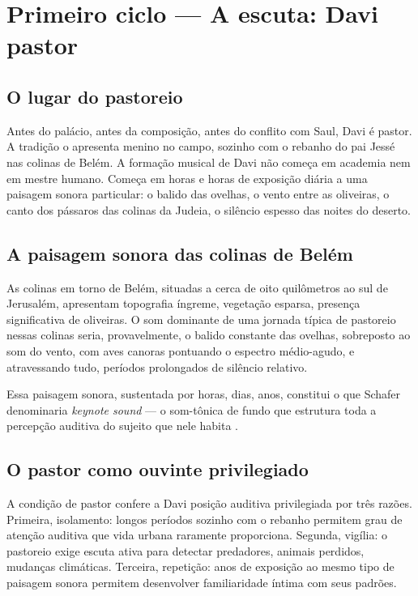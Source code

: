 \documentclass[12pt,a4paper]{article}
\begin{document}
\section{Primeiro ciclo --- A escuta: Davi pastor}

\subsection{O lugar do pastoreio}

Antes do palácio, antes da composição, antes do conflito com Saul, Davi é pastor. A tradição o apresenta menino no campo, sozinho com o rebanho do pai Jessé nas colinas de Belém. A formação musical de Davi não começa em academia nem em mestre humano. Começa em horas e horas de exposição diária a uma paisagem sonora particular: o balido das ovelhas, o vento entre as oliveiras, o canto dos pássaros das colinas da Judeia, o silêncio espesso das noites do deserto.

\subsection{A paisagem sonora das colinas de Belém}

As colinas em torno de Belém, situadas a cerca de oito quilômetros ao sul de Jerusalém, apresentam topografia íngreme, vegetação esparsa, presença significativa de oliveiras. O som dominante de uma jornada típica de pastoreio nessas colinas seria, provavelmente, o balido constante das ovelhas, sobreposto ao som do vento, com aves canoras pontuando o espectro médio-agudo, e atravessando tudo, períodos prolongados de silêncio relativo.

Essa paisagem sonora, sustentada por horas, dias, anos, constitui o que Schafer denominaria \emph{keynote sound} --- o som-tônica de fundo que estrutura toda a percepção auditiva do sujeito que nele habita \citep{Schafer1994}.

\subsection{O pastor como ouvinte privilegiado}

A condição de pastor confere a Davi posição auditiva privilegiada por três razões. Primeira, isolamento: longos períodos sozinho com o rebanho permitem grau de atenção auditiva que vida urbana raramente proporciona. Segunda, vigília: o pastoreio exige escuta ativa para detectar predadores, animais perdidos, mudanças climáticas. Terceira, repetição: anos de exposição ao mesmo tipo de paisagem sonora permitem desenvolver familiaridade íntima com seus padrões.
\end{document}
